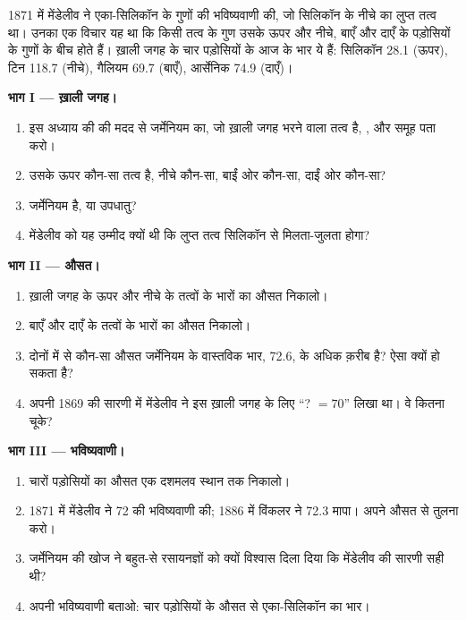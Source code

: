 \begin{problem}
\label{pb:g9:periodic-table-first-look:1}
1871 में मेंडेलीव ने एका-सिलिकॉन के गुणों की भविष्यवाणी की, जो सिलिकॉन के नीचे
का लुप्त तत्व था। उनका एक विचार यह था कि किसी तत्व के गुण उसके ऊपर और नीचे,
बाएँ और दाएँ के पड़ोसियों के गुणों के बीच होते हैं। ख़ाली जगह के चार पड़ोसियों के
आज के  भार ये हैं:
सिलिकॉन 28.1 (ऊपर), टिन 118.7 (नीचे), गैलियम 69.7 (बाएँ), आर्सेनिक
74.9 (दाएँ)।

\medskip
\noindent\textbf{भाग I --- ख़ाली जगह।}
\begin{enumerate}
  \item इस अध्याय की  की मदद से जर्मेनियम का, जो ख़ाली जगह भरने
        वाला तत्व है, ,  और समूह
        पता करो।
  \item उसके ऊपर कौन-सा तत्व है, नीचे कौन-सा, बाईं ओर कौन-सा, दाईं ओर
        कौन-सा?
  \item जर्मेनियम  है,  या उपधातु?
  \item मेंडेलीव को यह उम्मीद क्यों थी कि लुप्त तत्व सिलिकॉन से मिलता-जुलता
        होगा?
\end{enumerate}

\medskip
\noindent\textbf{भाग II --- औसत।}
\begin{enumerate}[resume]
  \item ख़ाली जगह के ऊपर और नीचे के तत्वों के  भारों का औसत
        निकालो।
  \item बाएँ और दाएँ के तत्वों के  भारों का औसत
        निकालो।
  \item दोनों में से कौन-सा औसत जर्मेनियम के वास्तविक  भार, 72.6, के अधिक
        क़रीब है? ऐसा क्यों हो सकता है?
  \item अपनी 1869 की सारणी में मेंडेलीव ने इस ख़ाली जगह के लिए ``? $= 70$''
        लिखा था। वे कितना चूके?
\end{enumerate}

\medskip
\noindent\textbf{भाग III --- भविष्यवाणी।}
\begin{enumerate}[resume]
  \item चारों पड़ोसियों का औसत एक दशमलव स्थान तक
        निकालो।
  \item 1871 में मेंडेलीव ने 72 की भविष्यवाणी की; 1886 में विंकलर ने 72.3 मापा।
        अपने औसत से तुलना करो।
  \item जर्मेनियम की खोज ने बहुत-से रसायनज्ञों को क्यों विश्वास दिला दिया कि
        मेंडेलीव की सारणी सही थी?
  \item अपनी भविष्यवाणी बताओ: चार पड़ोसियों के औसत से एका-सिलिकॉन का
         भार।
\end{enumerate}
\end{problem}
